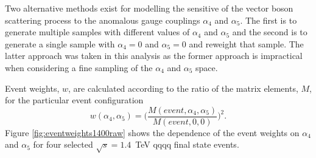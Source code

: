 Two alternative methods exist for modelling the sensitive of the vector boson scattering process to the anomalous gauge couplings $\alpha_{4}$ and $\alpha_{5}$.  The first is to generate multiple samples with different values of $\alpha_{4}$ and $\alpha_{5}$ and the second is to generate a single sample with $\alpha_{4} = 0$ and $\alpha_{5} = 0$ and reweight that sample.  The latter approach was taken in this analysis as the former approach is impractical when considering a fine sampling of the $\alpha_{4}$ and $\alpha_{5}$ space.

Event weights, $w$, are calculated according to the ratio of the matrix elements, $M$, for the particular event configuration \cite{WhizardManual}
\begin{equation}
w(\alpha_{4},\alpha_{5}) = \bigg(\frac{M(event,\alpha_{4},\alpha_{5})}{M(event,0,0)}\bigg)^{2} \text{.}
\end{equation}
Figure \ref{fig:eventweights1400raw} shows the dependence of the event weights on $\alpha_{4}$ and $\alpha_{5}$ for four selected $\sqrt{s}=1.4$~TeV \nu{\nu}qqqq final state events.

